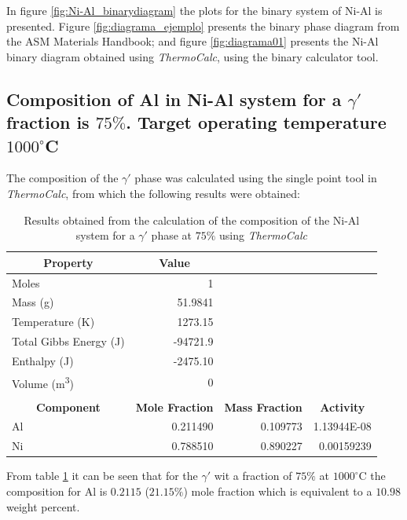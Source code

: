 In figure \ref{fig:Ni-Al_binarydiagram} the plots for the binary system of Ni-Al is presented. Figure \ref{fig:diagrama_ejemplo} presents the binary phase diagram from the ASM Materials Handbook; and figure \ref{fig:diagrama01} presents the Ni-Al binary diagram obtained using \textit{ThermoCalc}, using the binary calculator tool.

\newpage
\subsection{Composition of Al in Ni-Al system for a $\gamma'$ fraction is $75\%$. Target operating temperature $1000^{\circ}$C}

The composition of the $\gamma'$ phase was calculated using the single point tool in \textit{ThermoCalc}, from which the following results were obtained:

\begin{table}[H]
    \centering
    \begin{tabular}{lrrr}
        \multicolumn{1}{c}{\textbf{Property}} & \multicolumn{1}{c}{\textbf{Value}} \\ \hline \hline
        Moles & 1 \\ 
        Mass (g) & 51.9841 \\ 
        Temperature (K) & 1273.15 \\ 
        Total Gibbs Energy (J) & -94721.9 \\
        Enthalpy (J) & -2475.10 \\
        Volume (m\textsuperscript{3}) & 0 \\ \\
        \multicolumn{1}{c}{\textbf{Component}} & \multicolumn{1}{c}{\textbf{Mole Fraction}} & \multicolumn{1}{c}{\textbf{Mass Fraction}} & \multicolumn{1}{c}{\textbf{Activity}}\\ \hline \hline
        Al & 0.211490 & 0.109773 & 1.13944E-08 \\
        Ni & 0.788510 & 0.890227 & 0.00159239
    \end{tabular}
    \caption{Results obtained from the calculation of the composition of the Ni-Al system for a $\gamma'$ phase at $75\%$ using \textit{ThermoCalc} \citep{thermocalc}}
    \label{tab:tab01}
\end{table}

From table \ref{tab:tab01} it can be seen that for the $\gamma'$ wit a fraction of $75\%$ at $1000^{\circ}$C the composition for Al is $0.2115$ ($21.15\%$) mole fraction which is equivalent to a $10.98$ weight percent.